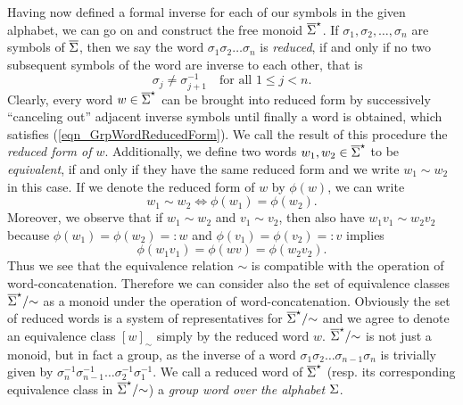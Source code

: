 Having now defined a formal inverse for each of our symbols in the given alphabet, we can go on and construct the free monoid ${\overline{\Sigma}}^{\star}$. If $\sigma_1, \sigma_2, \dots, \sigma_n$ are symbols of $\overline{\Sigma}$, then we say the word $\sigma_1 \sigma_2 \dots \sigma_n$ is \emph{reduced}, if and only if no two subsequent symbols of the word are inverse to each other, that is
\begin{equation}
\label{eqn_GrpWordReducedForm}
 \sigma_j \ne \sigma_{j+1}^{-1} \quad \text{for all } 1 \le j < n.
\end{equation}
Clearly, every word $w \in {\overline{\Sigma}}^{\star}$ can be brought into reduced form by successively ``canceling out'' adjacent inverse symbols until finally a word is obtained, which satisfies (\ref{eqn_GrpWordReducedForm}). We call the result of this procedure the \emph{reduced form of $w$}. Additionally, we define two words $w_1, w_2 \in {\overline{\Sigma}}^{\star}$ to be \emph{equivalent}, if and only if they have the same reduced form and we write $w_1 \sim w_2$ in this case. If we denote the reduced form of $w$ by $\phi(w)$, we can write
\begin{equation*}
w_1 \sim w_2 \Leftrightarrow \phi(w_1) = \phi(w_2).
\end{equation*}
Moreover, we observe that if $w_1 \sim w_2$ and $v_1 \sim v_2$, then also have $w_1 v_1 \sim w_2 v_2$ because $\phi(w_1) = \phi(w_2) =: w$ and $\phi(v_1) = \phi(v_2) =: v$ implies 
\begin{equation*}
\phi(w_1 v_1) = \phi(w v) = \phi(w_2 v_2).
\end{equation*}
Thus we see that the equivalence relation $\sim$ is compatible with the operation of word-concatenation. Therefore we can consider also the set of equivalence classes ${\overline{\Sigma}}^{\star}/{\sim}$ as a monoid under the operation of word-concatenation. Obviously the set of reduced words is a system of representatives for ${\overline{\Sigma}}^{\star}/{\sim}$ and we agree to denote an equivalence class $[w]_{\sim}$ simply by the reduced word $w$. ${\overline{\Sigma}}^{\star}/{\sim}$ is not just a monoid, but in fact a group, as the inverse of a word $\sigma_1 \sigma_2 \dots \sigma_{n-1} \sigma_n$ is trivially given by $\sigma_n^{-1} \sigma_{n-1}^{-1} \dots \sigma_2^{-1} \sigma_1^{-1}$. We call a reduced word of ${\overline{\Sigma}}^{\star}$ (resp. its corresponding equivalence class in ${\overline{\Sigma}}^{\star}/{\sim}$) a \emph{group word over the alphabet $\Sigma$}.

